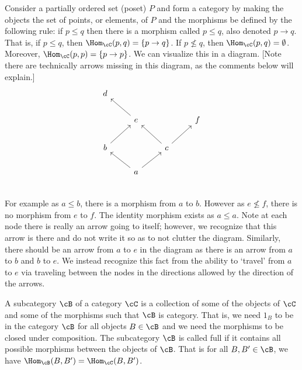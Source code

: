 \begin{ex}
Consider a partially ordered set (poset) $P$ and form a category by making the objects the set of points, or elements, of $P$ and the morphisms be defined by the following rule: if $p \leq q$ then there is a morphism called $p \leq q$, also denoted $p \rightarrow q$. That is, if $p \leq q$, then $\Hom_{\cC}(p,q)=\{p \rightarrow q\}$. If $p \not\leq q$, then $\Hom_{\cC}(p,q)=\emptyset$. Moreover, $\Hom_{\cC}(p,p)=\{p \rightarrow p\}$. We can visualize this in a diagram. [Note there are technically arrows missing in this diagram, as the comments below will explain.]
	\[
	\begin{tikzcd}
	d &  &  &  \\ 
	& e \arrow{ul} &  & f \\ 
	b \arrow{ur} &  & c \arrow{ul} \arrow{ur} &  \\ 
 	& a \arrow{ur} \arrow{ul} &  &  \\ 
	\end{tikzcd}
	\] 
For example as $a \leq b$, there is a morphism from $a$ to $b$. However as $e \not\leq f$, there is no morphism from $e$ to $f$. The identity morphism exists as $a \leq a$. Note at each node there is really an arrow going to itself; however, we recognize that this arrow is there and do not write it so as to not clutter the diagram. Similarly, there should be an arrow from $a$ to $e$ in the diagram as there is an arrow from $a$ to $b$ and $b$ to $e$. We instead recognize this fact from the ability to `travel' from $a$ to $e$ via traveling between the nodes in the directions allowed by the direction of the arrows. \xqed
\end{ex}


\begin{dfn}[Subcategory]
A subcategory $\cB$ of a category $\cC$ is a collection of some of the objects of $\cC$ and some of the morphisms such that $\cB$ is category. That is, we need $1_B$ to be in the category $\cB$ for all objects $B \in \cB$ and we need the morphisms to be closed under composition. The subcategory $\cB$ is called full if it contains all possible morphisms between the objects of $\cB$. That is for all $B,B' \in \cB$, we have $\Hom_{\cB}(B,B')=\Hom_{\cC}(B,B')$. 
\end{dfn}

